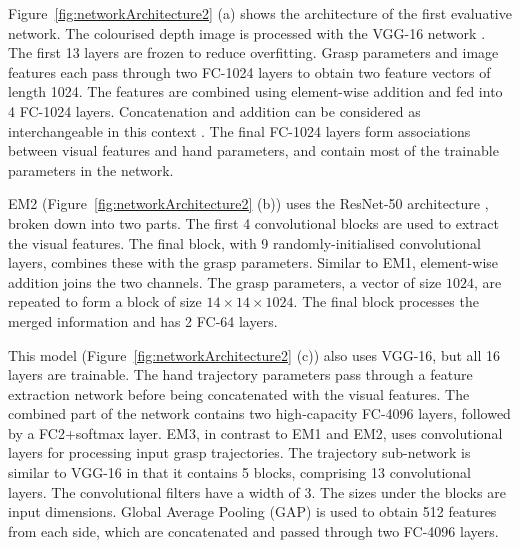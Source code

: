 \noindent
Figure~\ref{fig:networkArchitecture2} (a) shows the architecture of the first evaluative network. The colourised depth image is processed with the VGG-16 network \cite{Simonyan14c}. The first 13 layers are frozen to reduce overfitting. Grasp parameters and image features each pass through two FC-1024 layers to obtain two feature vectors of length 1024. The features are combined using element-wise addition and fed into 4 FC-1024 layers. Concatenation and addition can be considered as interchangeable in this context \cite{dumoulin2018feature-wise}. The final FC-1024 layers form associations between visual features and hand parameters, and contain most of the trainable parameters in the network.

\noindent
EM2 (Figure~\ref{fig:networkArchitecture2} (b)) uses the ResNet-50 architecture \cite{HeZRS15}, broken down into two parts. The first 4 convolutional blocks are used to extract the visual features. The final block, with 9 randomly-initialised convolutional layers, combines these with the grasp parameters. Similar to EM1, element-wise addition joins the two channels. The grasp parameters, a vector of size $1024$, are repeated to form a block of size $14 \times 14 \times 1024$. The final block processes the merged information and has 2 FC-64 layers.

\noindent
This model (Figure~\ref{fig:networkArchitecture2} (c)) also uses VGG-16, but all 16 layers are trainable. The hand trajectory parameters pass through a feature extraction network before being concatenated with the visual features. The combined part of the network contains two high-capacity FC-4096 layers, followed by a FC2+softmax layer. EM3, in contrast to EM1 and EM2, uses convolutional layers for processing input grasp trajectories. The trajectory sub-network is similar to VGG-16 in that it contains 5 blocks, comprising 13 convolutional layers. The convolutional filters have a width of 3. The sizes under the blocks are input dimensions. Global Average Pooling (GAP) is used to obtain 512 features from each side, which are concatenated and passed through two FC-4096 layers. 

